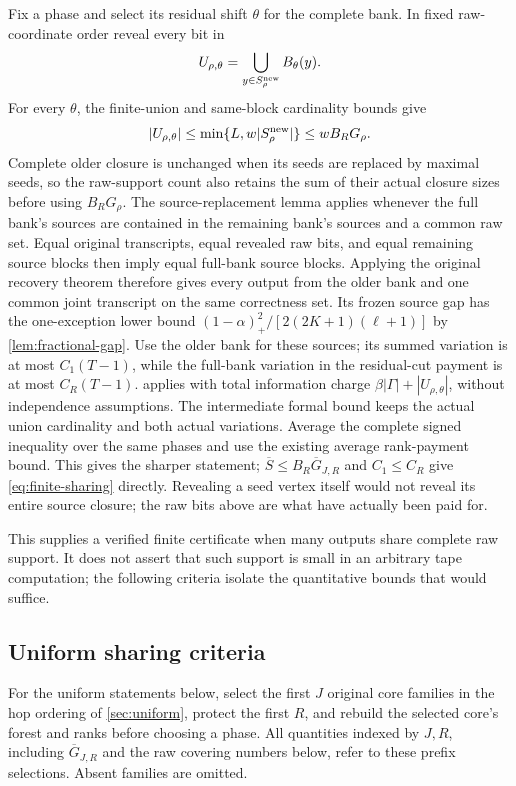 \begin{outline}
Fix a phase and select its residual shift $\theta$ for the complete
bank. In fixed raw-coordinate order reveal every bit in
\[
 U_{\rho,\theta}=
       \bigcup_{y\in S^{\rm new}_\rho}B_\theta(y).
\]
For every $\theta$, the finite-union and same-block cardinality bounds give
\[
 |U_{\rho,\theta}|\le\min\{L,w|S^{\rm new}_\rho|\}\le wB_RG_\rho.
\]
Complete older closure is unchanged when its seeds
are replaced by maximal seeds, so the raw-support count also retains
the sum of their actual closure sizes before using $B_RG_\rho$.
The source-replacement lemma applies whenever the full bank's sources
are contained in the remaining bank's sources and a common raw set.
Equal original transcripts, equal revealed raw bits, and equal remaining
source blocks then imply equal full-bank source blocks. Applying the original
recovery theorem therefore gives every output from the older bank and
one common joint transcript on the same correctness set. Its frozen
source gap has the one-exception lower bound
$(1-\alpha)_+^2/[2(2K+1)(\ell+1)]$ by
\cref{lem:fractional-gap}. Use the older bank for these sources;
its summed variation is at most $C_1(T-1)$, while the full-bank
variation in the residual-cut payment is at most $C_R(T-1)$.
 applies with total information charge
$\beta|\Gamma|+|U_{\rho,\theta}|$, without independence assumptions.
The intermediate formal bound keeps the actual union cardinality and
both actual variations. Average the complete signed inequality over
the same phases and use the existing average rank-payment bound.
This gives the sharper statement; $\overline S\le B_R\overline G_{J,R}$
and $C_1\le C_R$ give \cref{eq:finite-sharing} directly.
Revealing a seed vertex itself
would not reveal its entire source closure; the raw bits above are
what have actually been paid for.
\end{outline}

This supplies a verified finite certificate when many outputs share
complete raw support. It does not assert that such support is small
in an arbitrary tape computation; the following criteria isolate
the quantitative bounds that would suffice.

\subsection{Uniform sharing criteria}

For the uniform statements below, select the first $J$ original core
families in the hop ordering of \cref{sec:uniform}, protect the first
$R$, and rebuild the selected core's forest and ranks before choosing
a phase. All quantities indexed by $J,R$, including $\overline G_{J,R}$
and the raw covering numbers below, refer to these prefix selections.
Absent families are omitted.

